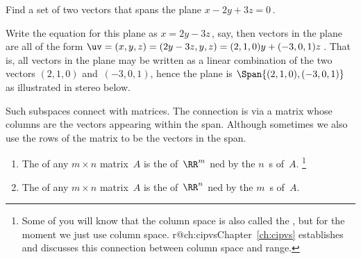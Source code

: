 \begin{example} \label{eg:planesubs}
Find a set of two vectors that spans the plane \(x-2y+3z=0\)\,.
\begin{solution} 
Write the equation for this plane as \(x=2y-3z\)\,, say, then vectors in the plane are all of the form \(\uv=(x,y,z)=(2y-3z,y,z) =(2,1,0)y+(-3,0,1)z\)\,.
That is, all vectors in the plane may be written as a linear combination of the two vectors \((2,1,0)\) and~\((-3,0,1)\),
hence the plane is \(\Span\{(2,1,0),(-3,0,1)\}\) as illustrated in stereo below. 
\begin{center}
 {}
\end{center}
\end{solution}
\end{example}



Such subspaces connect with matrices.
The connection is via a matrix whose columns are the vectors appearing within the span.
Although sometimes we also use the rows of the matrix to be the vectors in the span.


\begin{definition}\label{def:colsp} 
    \begin{enumerate}
        \item\label{def:colspa} The  of any $m\times n$ matrix~$A$ is the  of~$\RR^m$ ned by the \(n\)~s of~$A$.
        \footnote{Some of you will know that the column space is also called the , but for the moment we just use column space. \ifcsname r@ch:cipvs\endcsname Chapter~\ref{ch:cipvs} establishes and discusses this connection between column space and range.\fi}
        
		\item\label{def:colspb} The  of any $m\times n$ matrix~$A$ is the  of~$\RR^n$ ned by the \(m\)~s of~$A$.  
    \end{enumerate}
\end{definition}


